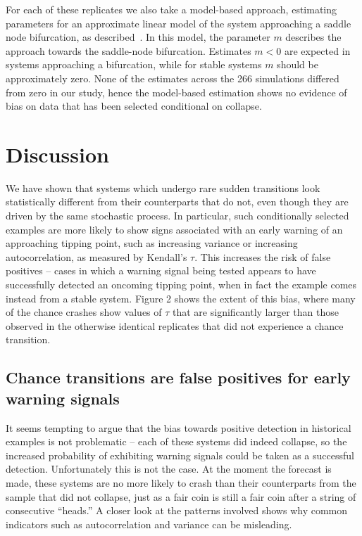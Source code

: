 For each of these replicates we also take a model-based
approach, estimating parameters for an approximate linear
model of the system approaching a saddle node bifurcation, as
described~\citet{Boettiger2012b}.  In this model, the parameter $m$
describes the approach towards the saddle-node bifurcation.  Estimates
$m < 0 $ are expected in systems approaching a bifurcation, while for
stable systems $m$ should be approximately zero. None of the estimates
across the 266 simulations differed from zero in our study, hence the
model-based estimation shows no evidence of bias on data that has been
selected conditional on collapse.



\section{Discussion}


We have shown that systems which undergo rare sudden transitions look
statistically different from their counterparts that do not, even though
they are driven by the same stochastic process.  In particular, such
conditionally selected examples are more likely to show signs associated
with an early warning of an approaching tipping point, such as increasing
variance or increasing autocorrelation, as measured by Kendall's $\tau$.
This increases the risk of false positives -- cases in which a warning
signal being tested appears to have successfully detected an oncoming
tipping point, when in fact the example comes
instead from a stable system. Figure 2 shows the extent of this bias,
where many of the chance crashes show values of $\tau$ that are 
significantly larger than those observed in the otherwise identical
replicates that did not experience a chance transition.  


\subsection{Chance transitions are false positives for early warning signals}

It seems tempting to argue that the bias towards positive detection
in historical examples is not problematic -- each of these systems did
indeed collapse, so the increased probability
of exhibiting warning signals could be taken as a successful detection.
Unfortunately this is not the case. At the moment the forecast is made,
these systems are no more likely to crash than their counterparts from
the sample that did not collapse, just as a fair coin is still a fair
coin after a string of consecutive ``heads.''  A closer look at
the patterns involved shows why common indicators
such as autocorrelation and variance can be misleading.

